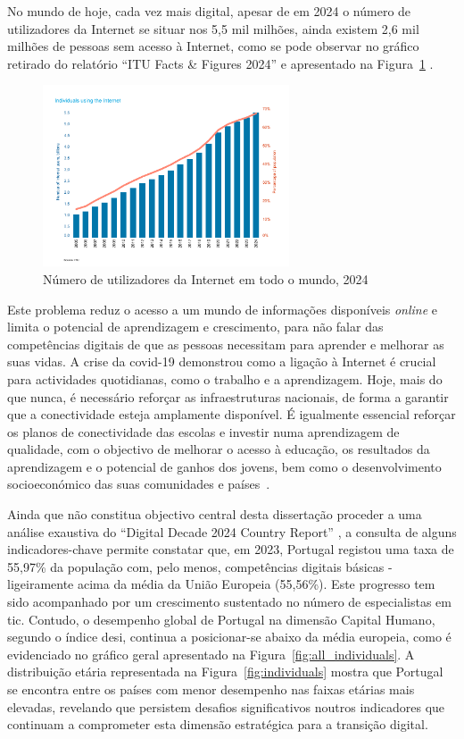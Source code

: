 No mundo de hoje, cada vez mais digital, apesar de em 2024 o número de utilizadores da Internet se situar nos 5,5 mil milhões, ainda existem 2,6 mil milhões de pessoas sem acesso à Internet, como se pode observar no gráfico retirado do relatório ``ITU Facts \& Figures 2024'' e apresentado na Figura~\ref{fig:numutilizadoresnet} \cite{broadbandcomission, itu2024facts}.

\begin{figure}[hbtp]
    \centering
    \includegraphics[width=0.65\textwidth]{figures/ITU-InternetUse.png}
    \caption{Número de utilizadores da Internet em todo o mundo, 2024 \cite{itu2024facts}}
    \label{fig:numutilizadoresnet}
\end{figure}
Este problema reduz o acesso a um mundo de informações disponíveis \textit{online} e limita o potencial de aprendizagem e crescimento, para não falar das competências digitais de que as pessoas necessitam para aprender e melhorar as suas vidas.
A crise da \acrshort{covid-19} demonstrou como a ligação à Internet é crucial para actividades quotidianas, como o trabalho e a aprendizagem. Hoje, mais do que nunca, é necessário reforçar as infraestruturas nacionais, de forma a garantir que a conectividade esteja amplamente disponível. É igualmente essencial reforçar os planos de conectividade das escolas e investir numa aprendizagem de qualidade, com o objectivo de melhorar o acesso à educação, os resultados da aprendizagem e o potencial de ganhos dos jovens, bem como o desenvolvimento socioeconómico das suas comunidades e países~\cite{TheDigitransf}.

Ainda que não constitua objectivo central desta dissertação proceder a uma análise exaustiva do ``Digital Decade 2024 Country Report'' \cite{DESI2024}, a consulta de alguns indicadores-chave permite constatar que, em 2023, Portugal registou uma taxa de 55,97\% da população com, pelo menos, competências digitais básicas - ligeiramente acima da média da União Europeia (55,56\%). Este progresso tem sido acompanhado por um crescimento sustentado no número de especialistas em \acrfull{tic}.
Contudo, o desempenho global de Portugal na dimensão Capital Humano, segundo o índice \acrfull{desi}, continua a posicionar-se abaixo da média europeia, como é evidenciado no gráfico geral apresentado na Figura~\ref{fig:all_individuals}. A distribuição etária representada na Figura~\ref{fig:individuals} mostra que Portugal se encontra entre os países com menor desempenho nas faixas etárias mais elevadas, revelando que persistem desafios significativos noutros indicadores que continuam a comprometer esta dimensão estratégica para a transição digital.

